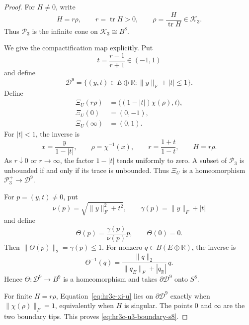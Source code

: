 \begin{proof}
For \(H\ne0\), write
\[
 H=r\rho,
 \qquad
 r=\operatorname{tr}H>0,
 \qquad
 \rho=\frac{H}{\operatorname{tr}H}\in\mathcal K_3.
\]
Thus \(\mathcal P_3\) is the infinite cone on
\(\mathcal K_3\cong B^8\).

We give the compactification map explicitly.  Put
\[
 t=\frac{r-1}{r+1}\in(-1,1)
\]
and define
\begin{equation}
 \mathcal D^9=
 \{(y,t)\in E\oplus\mathbb R:
 \lVert y\rVert_F+|t|\leq1\}.
 \label{eq:hr3c-double-cone}
\end{equation}
Define
\begin{equation}
 \begin{split}
 \Xi_U(r\rho)
  &=\bigl((1-|t|)\chi(\rho),t\bigr),\\
 \Xi_U(0)&=(0,-1),\\
 \Xi_U(\infty)&=(0,1).
 \end{split}
 \label{eq:hr3c-xi-u}
\end{equation}
For \(|t|<1\), the inverse is
\begin{equation}
 x=\frac{y}{1-|t|},
 \qquad
 \rho=\chi^{-1}(x),
 \qquad
 r=\frac{1+t}{1-t},
 \qquad
 H=r\rho.
 \label{eq:hr3c-xi-u-inverse}
\end{equation}
As \(r\downarrow0\) or \(r\to\infty\), the factor \(1-|t|\) tends
uniformly to zero.  A subset of \(\mathcal P_3\) is unbounded if and only
if its trace is unbounded.  Thus \(\Xi_U\) is a homeomorphism
\(\mathcal P_3^+\to\mathcal D^9\).

For \(p=(y,t)\ne0\), put
\[
 \nu(p)=\sqrt{\lVert y\rVert_F^2+t^2},
 \qquad
 \gamma(p)=\lVert y\rVert_F+|t|
\]
and define
\begin{equation}
 \Theta(p)=\frac{\gamma(p)}{\nu(p)}p,
 \qquad
 \Theta(0)=0.
 \label{eq:hr3c-double-cone-ball-map}
\end{equation}
Then \(\lVert\Theta(p)\rVert_2=\gamma(p)\leq1\).  For nonzero
\(q\in B(E\oplus\mathbb R)\), the inverse is
\begin{equation}
 \Theta^{-1}(q)=
 \frac{\lVert q\rVert_2}
 {\lVert q_E\rVert_F+|q_{\mathbb R}|}\,q.
 \label{eq:hr3c-double-cone-ball-inverse}
\end{equation}
Hence \(\Theta:\mathcal D^9\to B^9\) is a homeomorphism and takes
\(\partial\mathcal D^9\) onto \(S^8\).

For finite \(H=r\rho\), Equation~\eqref{eq:hr3c-xi-u} lies on
\(\partial\mathcal D^9\) exactly when
\(\lVert\chi(\rho)\rVert_F=1\), equivalently when \(H\) is singular.
The points \(0\) and \(\infty\) are the two boundary tips.  This proves
\eqref{eq:hr3c-u3-boundary-s8}.


\end{proof}
